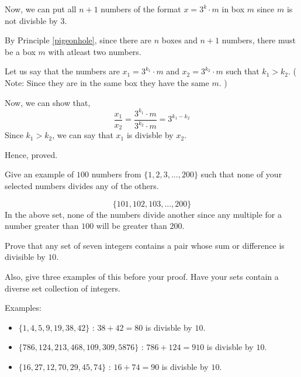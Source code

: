 \begin{solution}
Now, we can put all $n+1$ numbers of the format $x = 3^k \cdot m$ in box $m$ since $m$ is not divisble by $3$.

By Principle \ref{pigeonhole}, since there are $n$ boxes and $n+1$ numbers, there must be a box $m$ with atleast two numbers.

Let us say that the numbers are $x_1 = 3^{k_1} \cdot m$ and $x_2 = 3^{k_2} \cdot m$ such that $k_1 > k_2$. ( Note: Since they are in the same box they have the same $m$. )

Now, we can show that,
$$\frac{x_1}{x_2} = \frac{3^{k_1} \cdot m}{3^{k_2} \cdot m} = 3^{k_1 - k_2}$$
Since $k_1 > k_2$, we can say that $x_1$ is divisble by $x_2$.

Hence, proved.

\end{solution}

\begin{problem}
	Give an example of $100$ numbers from $\{1, 2, 3, ..., 200\}$ such that none of your selected numbers divides any of the others.
\end{problem}

\begin{solution}
	$$\{101,102,103,...,200\}$$
	In the above set, none of the numbers divide another since any multiple for a number greater than $100$ will be greater than $200$.
\end{solution}

\begin{problem}
	Prove that any set of seven integers contains a pair whose sum or difference is divisible by $10$. 

	Also, give three examples of this before your proof. Have your sets contain a diverse set collection of integers.
\end{problem}

\begin{scratch}
	Examples:
	\begin{itemize}
		\item $\{ 1, 4, 5, 9, 19, 38, 42 \}$ : $38+42=80$ is divisble by $10$.
		\item $\{ 786, 124, 213, 468, 109, 309, 5876 \}$ : $786+124=910$ is divisble by $10$.
		\item $\{ 16, 27, 12, 70, 29, 45, 74 \}$ : $16+74=90$ is divisble by $10$.
	\end{itemize}
\end{scratch}

